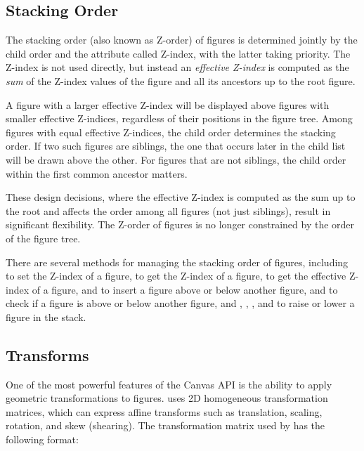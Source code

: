 
\subsection{Stacking Order}
\label{sec:graphics:canvas-stacking-order}

The stacking order (also known as Z-order) of figures is determined jointly by
the child order and the  attribute called Z-index, with the
latter taking priority. The Z-index is not used directly, but instead an
\textit{effective Z-index} is computed as the \textit{sum} of the Z-index values
of the figure and all its ancestors up to the root figure.

A figure with a larger effective Z-index will be displayed above figures with
smaller effective Z-indices, regardless of their positions in the figure tree.
Among figures with equal effective Z-indices, the child order determines the
stacking order. If two such figures are siblings, the one that occurs later in
the child list will be drawn above the other. For figures that are not siblings,
the child order within the first common ancestor matters.

These design decisions, where the effective Z-index is computed as the sum up to
the root and affects the order among all figures (not just siblings), result in
significant flexibility. The Z-order of figures is no longer constrained by the
order of the figure tree.

There are several methods for managing the stacking order of figures, including
 to set the Z-index of a figure,  to get
the Z-index of a figure,  to get the effective
Z-index of a figure,  and  to insert a
figure above or below another figure,  and  to
check if a figure is above or below another figure, and ,
, , and  to raise
or lower a figure in the stack.


\subsection{Transforms}
\label{sec:graphics:canvas-transforms}

One of the most powerful features of the Canvas API is the ability to apply
geometric transformations to figures. {\opp} uses 2D homogeneous transformation
matrices, which can express affine transforms such as translation, scaling,
rotation, and skew (shearing). The transformation matrix used by {\opp} has the
following format:

